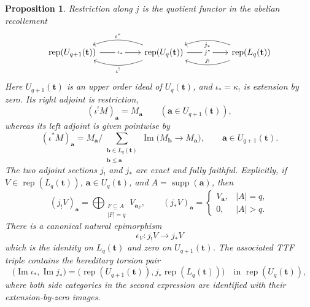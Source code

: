 \documentclass[10pt,a4paper]{amsart}
\newtheorem{proposition}[theorem]{Proposition}
\newcommand{\Rep}{\operatorname{rep}}
\begin{document}
\begin{proposition}\label{prop:horizontal-embeddings}
Restriction along $j$ is the quotient functor in the abelian recollement
\[
\begin{tikzcd}[column sep=4.8em]
\Rep(U_{q+1}(\mathbf t))
  \arrow[r, "\iota_*" description]
& \Rep(U_q(\mathbf t))
  \arrow[l, bend right=20, "\iota^*"']
  \arrow[l, bend left=20, "\iota^!"]
  \arrow[r, "j^*" description]
& \Rep(L_q(\mathbf t))
  \arrow[l, bend left=20, "j_!"']
  \arrow[l, bend right=20, "j_*"]
\end{tikzcd}
\]
Here $U_{q+1}(\mathbf t)$ is an upper order ideal of $U_q(\mathbf t)$, and
$\iota_*=\kappa_!$ is extension by zero.  Its right adjoint is restriction,
\[
(\iota^!M)_{\mathbf a}=M_{\mathbf a}
\qquad(\mathbf a\in U_{q+1}(\mathbf t)),
\]
whereas its left adjoint is given pointwise by
\[
(\iota^*M)_{\mathbf a}
=
M_{\mathbf a}\Big/
\sum_{\substack{\mathbf b\in L_q(\mathbf t)\\\mathbf b\le\mathbf a}}
\operatorname{Im}\bigl(M_{\mathbf b}\longrightarrow M_{\mathbf a}\bigr),
\qquad \mathbf a\in U_{q+1}(\mathbf t).
\]
The two adjoint sections $j_!$ and $j_*$ are exact and fully faithful.  Explicitly, if $V\in\Rep(L_q(\mathbf t))$, $\mathbf a\in U_q(\mathbf t)$, and $A=\operatorname{supp}(\mathbf a)$, then
\[
(j_!V)_{\mathbf a}
=
\bigoplus_{\substack{F\subseteq A\\|F|=q}}V_{\mathbf a_F},
\qquad
(j_*V)_{\mathbf a}
=
\begin{cases}
V_{\mathbf a},&|A|=q,\\
0,&|A|>q.
\end{cases}
\]
There is a canonical natural epimorphism
\[
\epsilon_V:j_!V\longrightarrow j_*V
\]
which is the identity on $L_q(\mathbf t)$ and zero on $U_{q+1}(\mathbf t)$.
The associated TTF triple contains the hereditary torsion pair
\[
\bigl(\operatorname{Im}\iota_*,\operatorname{Im}j_*\bigr)
=
\bigl(\Rep(U_{q+1}(\mathbf t)),j_*\Rep(L_q(\mathbf t))\bigr)
\quad\text{in }\Rep(U_q(\mathbf t)),
\]
where both side categories in the second expression are identified with their
extension-by-zero images.
\end{proposition}
\end{document}
